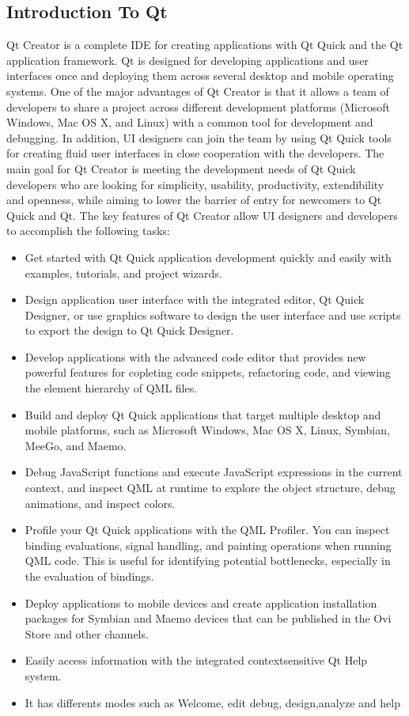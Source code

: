 \subsection{Introduction To Qt}
\noindent Qt Creator is a complete IDE for creating applications with Qt Quick and the Qt application framework. Qt is designed for developing applications and user interfaces once and deploying them across several desktop and mobile operating systems. One of the major advantages of Qt Creator is that it allows a team of developers to share a project across different development platforms (Microsoft Windows, Mac OS X, and Linux) with a common tool for development and debugging.
In addition, UI designers can join the team by using Qt Quick tools for creating fluid user interfaces in close cooperation with the developers. The main goal for Qt Creator is meeting the development needs of Qt Quick developers who are looking for simplicity, usability, productivity, extendibility and openness, while aiming to lower the barrier of entry for newcomers to Qt Quick and Qt. The key features of Qt Creator allow UI designers and developers to accomplish the following tasks:
\begin{itemize}
\item Get  started  with  Qt  Quick  application  development  quickly  and  easily  with  examples,  tutorials,
and project wizards.
\item Design  application  user  interface  with  the  integrated  editor,  Qt  Quick  Designer,  or  use graphics
software to design the user interface and use scripts to export the design to Qt Quick Designer.
\item Develop  applications   with  the   advanced  code  editor  that  provides  new  powerful  features  for
copleting code snippets, refactoring code, and viewing the element hierarchy of QML files.
\item Build  and  deploy  Qt  Quick  applications  that  target  multiple  desktop and mobile platforms, such
as Microsoft Windows, Mac OS X, Linux, Symbian, MeeGo, and Maemo.
\item Debug  JavaScript  functions  and  execute  JavaScript  expressions  in  the  current  context,   and
inspect QML at runtime to explore the object structure, debug animations, and inspect colors.
\item Profile  your  Qt  Quick  applications  with  the  QML  Profiler.  You can inspect binding evaluations,
signal  handling,  and  painting  operations  when  running  QML  code.  This  is  useful  for  identifying
potential bottlenecks, especially in the evaluation of bindings.
\item Deploy  applications  to  mobile  devices  and  create  application  installation  packages  for  Symbian
and Maemo devices that can be published in the Ovi Store and other channels.
\item Easily access information with the integrated context­sensitive Qt Help system.
\item It has differents modes such as Welcome, edit debug, design,analyze and help
\end{itemize}
